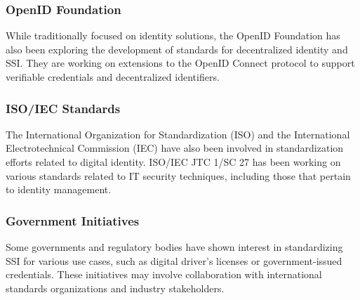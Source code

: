 \subsubsection{OpenID Foundation} While traditionally focused on identity solutions, the OpenID Foundation has also been exploring the development of standards for decentralized identity and SSI. They are working on extensions to the OpenID Connect protocol to support verifiable credentials and decentralized identifiers.

\subsubsection{ISO/IEC Standards} The International Organization for Standardization (ISO) and the International Electrotechnical Commission (IEC) have also been involved in standardization efforts related to digital identity. ISO/IEC JTC 1/SC 27 has been working on various standards related to IT security techniques, including those that pertain to identity management.

\subsubsection{Government Initiatives} Some governments and regulatory bodies have shown interest in standardizing SSI for various use cases, such as digital driver's licenses or government-issued credentials. These initiatives may involve collaboration with international standards organizations and industry stakeholders.

